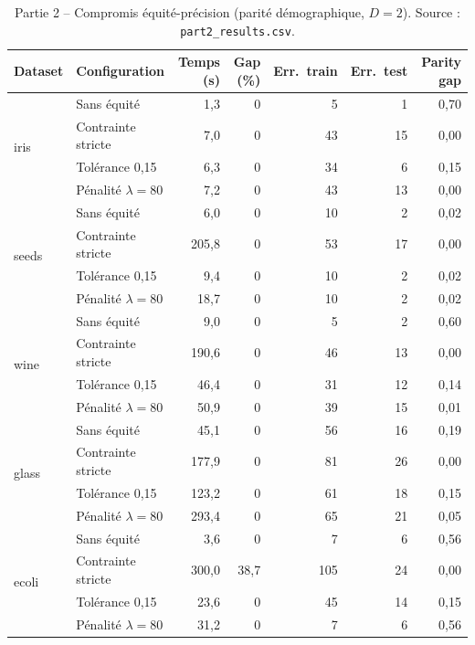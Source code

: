 \documentclass[a4paper,10pt,titlepage,leqno]{article}
\begin{document}
\begin{table}[H]
\centering
\caption{Partie 2 -- Compromis équité-précision (parité démographique, $D=2$). Source : \texttt{part2\_results.csv}.}
\label{tab:part2}
\small
\begin{tabular}{@{}l l r r r r r@{}}
\toprule
Dataset & Configuration & Temps (s) & Gap (\%) & Err.\ train & Err.\ test & Parity gap \\
\midrule
\multirow{4}{*}{iris}
 & Sans équité        & 1{,}3  & 0 & 5  & 1  & 0{,}70 \\
 & Contrainte stricte & 7{,}0  & 0 & 43 & 15 & 0{,}00 \\
 & Tolérance 0{,}15   & 6{,}3  & 0 & 34 & 6  & 0{,}15 \\
 & Pénalité $\lambda{=}80$ & 7{,}2  & 0 & 43 & 13 & 0{,}00 \\
\midrule
\multirow{4}{*}{seeds}
 & Sans équité        & 6{,}0  & 0 & 10 & 2 & 0{,}02 \\
 & Contrainte stricte & 205{,}8 & 0 & 53 & 17 & 0{,}00 \\
 & Tolérance 0{,}15   & 9{,}4  & 0 & 10 & 2  & 0{,}02 \\
 & Pénalité $\lambda{=}80$ & 18{,}7 & 0 & 10 & 2  & 0{,}02 \\
\midrule
\multirow{4}{*}{wine}
 & Sans équité        & 9{,}0  & 0 & 5  & 2  & 0{,}60 \\
 & Contrainte stricte & 190{,}6 & 0 & 46 & 13 & 0{,}00 \\
 & Tolérance 0{,}15   & 46{,}4 & 0 & 31 & 12 & 0{,}14 \\
 & Pénalité $\lambda{=}80$ & 50{,}9 & 0 & 39 & 15 & 0{,}01 \\
\midrule
\multirow{4}{*}{glass}
 & Sans équité        & 45{,}1 & 0 & 56 & 16 & 0{,}19 \\
 & Contrainte stricte & 177{,}9 & 0 & 81 & 26 & 0{,}00 \\
 & Tolérance 0{,}15   & 123{,}2 & 0 & 61 & 18 & 0{,}15 \\
 & Pénalité $\lambda{=}80$ & 293{,}4 & 0 & 65 & 21 & 0{,}05 \\
\midrule
\multirow{4}{*}{ecoli}
 & Sans équité        & 3{,}6  & 0 & 7  & 6  & 0{,}56 \\
 & Contrainte stricte & 300{,}0 & 38{,}7 & 105 & 24 & 0{,}00 \\
 & Tolérance 0{,}15   & 23{,}6 & 0 & 45 & 14 & 0{,}15 \\
 & Pénalité $\lambda{=}80$ & 31{,}2 & 0 & 7  & 6  & 0{,}56 \\
\bottomrule
\end{tabular}
\end{table}
\end{document}
